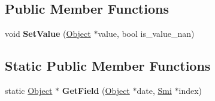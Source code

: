 \subsection*{Public Member Functions}
\begin{DoxyCompactItemize}
\item 
\hypertarget{classv8_1_1internal_1_1_j_s_date_a23103dbde943e9378b3dcaa836195066}{}void {\bfseries Set\+Value} (\hyperlink{classv8_1_1internal_1_1_object}{Object} $\ast$value, bool is\+\_\+value\+\_\+nan)\label{classv8_1_1internal_1_1_j_s_date_a23103dbde943e9378b3dcaa836195066}

\end{DoxyCompactItemize}
\subsection*{Static Public Member Functions}
\begin{DoxyCompactItemize}
\item 
\hypertarget{classv8_1_1internal_1_1_j_s_date_aaab7884334a6c78e3ef03826ef904b92}{}static \hyperlink{classv8_1_1internal_1_1_object}{Object} $\ast$ {\bfseries Get\+Field} (\hyperlink{classv8_1_1internal_1_1_object}{Object} $\ast$date, \hyperlink{classv8_1_1internal_1_1_smi}{Smi} $\ast$index)\label{classv8_1_1internal_1_1_j_s_date_aaab7884334a6c78e3ef03826ef904b92}

\end{DoxyCompactItemize}
